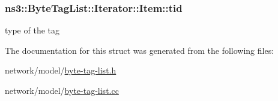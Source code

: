 \subsubsection[{\texorpdfstring{tid}{tid}}]{ ns3\+::\+Byte\+Tag\+List\+::\+Iterator\+::\+Item\+::tid}\hypertarget{structns3_1_1ByteTagList_1_1Iterator_1_1Item_a0b2c2b02b42bdb44e5e30957326fa9c4}{}\label{structns3_1_1ByteTagList_1_1Iterator_1_1Item_a0b2c2b02b42bdb44e5e30957326fa9c4}


type of the tag 



The documentation for this struct was generated from the following files\+:\begin{DoxyCompactItemize}
\item 
network/model/\hyperlink{byte-tag-list_8h}{byte-\/tag-\/list.\+h}\item 
network/model/\hyperlink{byte-tag-list_8cc}{byte-\/tag-\/list.\+cc}\end{DoxyCompactItemize}
